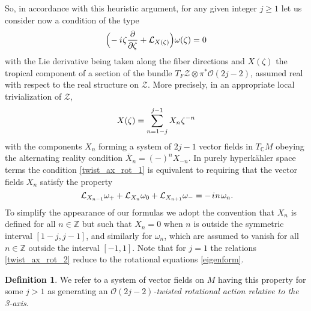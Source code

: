 \documentclass[11pt]{amsart}
\theoremstyle{remark}
\theoremstyle{remark}
\theoremstyle{definition}
\newtheorem*{definition}{Definition}
\theoremstyle{definition}
\theoremstyle{definition}
\newcommand{\0}{{\scriptstyle 0'}} %
\newcommand{\1}{{\scriptstyle 1'}}
\newcommand{\pt}{\hspace{1pt}} %
\newcommand{\hp}{\hspace{0.5pt}} %
\begin{document}
So, in accordance with this heuristic argument, for any given integer $j \geq 1$ let us consider now a condition of the type
\begin{equation} \label{twist_ax_rot_1}
\Big(\! - i \hp \zeta \frac{\partial}{\partial \zeta} + \mathcal{L}_{X(\zeta)} \Big) \omega(\zeta) = 0
\end{equation}
with the Lie derivative being taken along the fiber directions and $X(\zeta)$ the tropical component of a section of the bundle $T_F\mathcal{Z} \otimes \pi^*\mathcal{O}(2j-2)$, assumed real with respect to the real structure on $\mathcal{Z}$. More precisely, in an appropriate local trivialization of $\mathcal{Z}$,
\begin{equation} \label{twist_X}
X(\zeta) = \sum_{n =1-j}^{j-1} X_n \hp \zeta^{-n}
\end{equation}
with the components $X_n$ forming a system of $2j-1$ vector fields in $T_{\mathbb{C}}M$ obeying the alternating reality condition $\bar{X}_{n} = (-)^n X_{-n}$. In purely hyperk\"ahler space terms the condition \eqref{twist_ax_rot_1} is equivalent to requiring that the vector fields $X_n$ satisfy the property
\begin{equation} \label{twist_ax_rot_2}
\mathcal{L}_{X_{n-1}} \omega_+ + \mathcal{L}_{X_{n}} \omega_0 + \mathcal{L}_{X_{n+1}} \omega_- = - \pt i \hp n \pt \omega_n \rlap{.}
\end{equation}
To simplify the appearance of our formulas we adopt the convention that $X_n$ is defined for all $n \in \mathbb{Z}$ but such that $X_n = 0$ when $n$ is outside the symmetric interval $[1-j,j-1]$, and similarly for $\omega_n$, which are assumed to vanish for all $n \in \mathbb{Z}$ outside the interval $[-1,1]$. Note that for $j=1$ the relations \eqref{twist_ax_rot_2} reduce to the rotational equations \eqref{eigenform}.

\begin{definition}
We refer to a system of vector fields on $M$ having this property for some $j > 1$ as generating an \textit{$\mathcal{O}(2j-2)$-twisted rotational action relative to the 3-axis}.
\end{definition}
\end{document}
